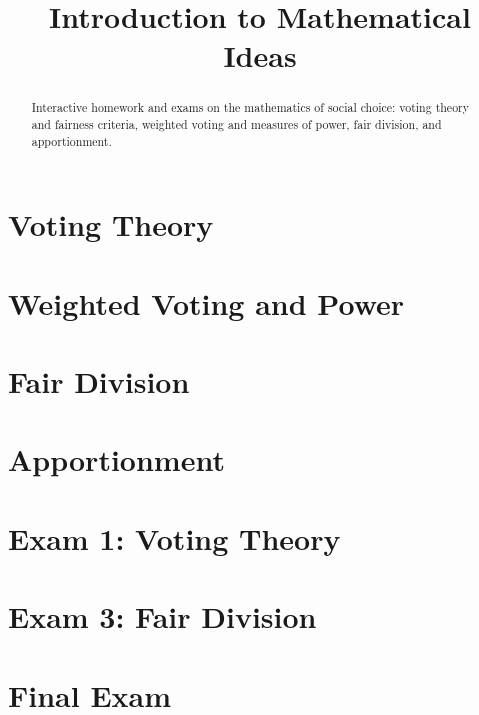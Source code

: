 \documentclass{xourse}
\title{Introduction to Mathematical Ideas}
\author{}
\begin{document}
\begin{abstract}
    Interactive homework and exams on the mathematics of social choice: voting theory and fairness criteria, weighted voting and measures
    of power, fair division, and apportionment.
\end{abstract}
\maketitle

\part{Voting Theory}


\part{Weighted Voting and Power}


\part{Fair Division}


\part{Apportionment}


\part{Exam 1: Voting Theory}


\part{Exam 3: Fair Division}


\part{Final Exam}

\end{document}
